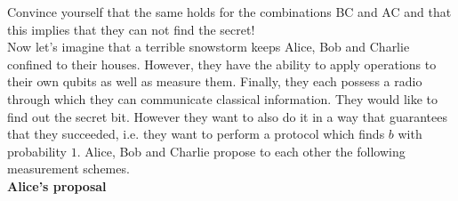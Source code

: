 \begin{exercises}
\begin{enumerate}
\end{enumerate}
Convince yourself that the same holds for the combinations BC and AC and that this implies that they can not find the secret! \\
Now let's imagine that a terrible snowstorm keeps Alice, Bob and Charlie confined to their houses. However, they have the ability to apply operations to their own qubits as well as measure them. Finally, they each possess a radio through which they can communicate classical information. They would like to find out the secret bit. However they want to also do it in a way that guarantees that they succeeded, i.e. they want to perform a protocol which finds \(b\) with probability \(1\). Alice, Bob and Charlie propose to each other the following measurement schemes. \\
\textbf{Alice's proposal}

\end{exercises}
